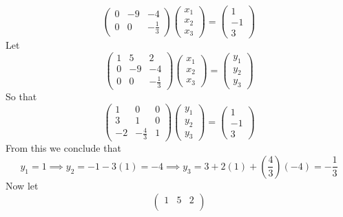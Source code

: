 \begin{solution}
\[\begin{pmatrix}
                    0 & -9 & -4\\
                    0 & 0 & -\frac{1}{3}
                  \end{pmatrix}
                  \begin{pmatrix}
                    x_{1}\\
                    x_{2}\\
                    x_{3}
                  \end{pmatrix}
=
                  \begin{pmatrix}
                    1\\
                    -1\\
                    3
                  \end{pmatrix}
\]
  Let
  \[
\begin{pmatrix}
       1 & 5 & 2\\
       0 & -9 & -4\\
       0 & 0 & -\frac{1}{3}
     \end{pmatrix}
     \begin{pmatrix}
       x_{1}\\
       x_{2}\\
       x_{3}
     \end{pmatrix}
=
     \begin{pmatrix}
       y_{1}\\
       y_{2}\\
       y_{3}
     \end{pmatrix}
\]
   So that
   \[
\begin{pmatrix}
        1 & 0 & 0\\
        3 & 1 & 0\\
        -2 & -\frac{4}{3} & 1
      \end{pmatrix}
      \begin{pmatrix}
        y_{1}\\
        y_{2}\\
        y_{3}
      \end{pmatrix}
=
      \begin{pmatrix}
        1\\
        -1\\
        3
      \end{pmatrix}
\]
    From this we conclude that
    \[
y_{1} = 1 \implies y_{2} = -1 - 3(1) = -4
      \implies y_{3} = 3 + 2(1) + (\frac{4}{3})(-4)
      = -\frac{1}{3}
\]
Now let
    \[
\begin{pmatrix}
         1 & 5 & 2\\

\end{pmatrix}\]
\end{solution}
